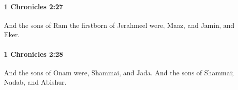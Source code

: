 		\paragraph{1 Chronicles 2:27} %
			\label{1CHRONICLES-2-27}

			And the sons of Ram the firstborn of Jerahmeel were, Maaz, and Jamin, and Eker.


		\paragraph{1 Chronicles 2:28} %
			\label{1CHRONICLES-2-28}

			And the sons of Onam were, Shammai, and Jada. And the sons of Shammai; Nadab, and Abishur.


